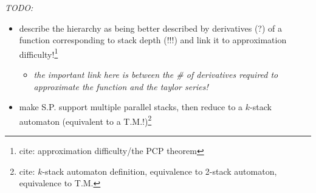 \documentclass[10pt]{article}
\newcommand{\todocite}[1]{\footnote{cite: #1}}
\begin{document}
\textit{TODO:}
\begin{itemize}
\item describe the hierarchy as being better described by derivatives (?) of a function corresponding to stack depth (!!!) and link it to approximation difficulty!\todocite{approximation difficulty/the PCP theorem}
\begin{itemize}
\item \textit{the important link here is between the \# of derivatives required to approximate the function and the taylor series!}
\end{itemize}
\item make S.P. support multiple parallel stacks, then reduce  to a $k$-stack automaton (equivalent to a T.M.!)\todocite{$k$-stack automaton definition, equivalence to 2-stack automaton, equivalence to T.M.}
\end{itemize}

\printbibliography
\end{document}
